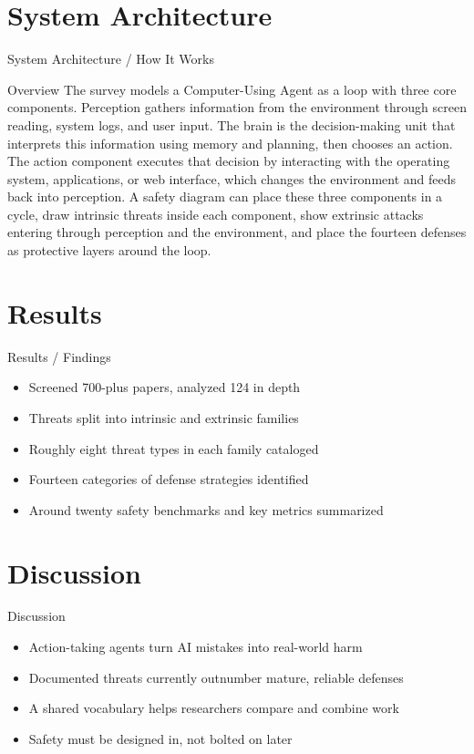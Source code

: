 \documentclass[10pt]{beamer}
\begin{document}
\section{System Architecture}
\begin{frame}{System Architecture / How It Works}
  \begin{block}{Overview}
  The survey models a Computer-Using Agent as a loop with three core components. Perception gathers information from the environment through screen reading, system logs, and user input. The brain is the decision-making unit that interprets this information using memory and planning, then chooses an action. The action component executes that decision by interacting with the operating system, applications, or web interface, which changes the environment and feeds back into perception. A safety diagram can place these three components in a cycle, draw intrinsic threats inside each component, show extrinsic attacks entering through perception and the environment, and place the fourteen defenses as protective layers around the loop.
  \end{block}
\end{frame}

\section{Results}
\begin{frame}[allowframebreaks]{Results / Findings}
\begin{itemize}
  \item Screened 700-plus papers, analyzed 124 in depth
  \item Threats split into intrinsic and extrinsic families
  \item Roughly eight threat types in each family cataloged
  \item Fourteen categories of defense strategies identified
  \item Around twenty safety benchmarks and key metrics summarized
\end{itemize}
\end{frame}

\section{Discussion}
\begin{frame}{Discussion}
\begin{itemize}
  \item Action-taking agents turn AI mistakes into real-world harm
  \item Documented threats currently outnumber mature, reliable defenses
  \item A shared vocabulary helps researchers compare and combine work
  \item Safety must be designed in, not bolted on later
\end{itemize}
\end{frame}
\end{document}
